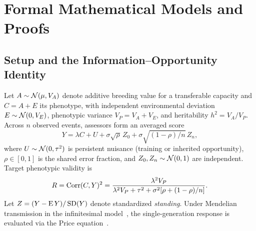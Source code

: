 
\appendices
\setcounter{equation}{0}
\renewcommand{\theequation}{A\arabic{equation}}
\renewcommand{\theHequation}{AppA.eq.\arabic{equation}}

\section{Formal Mathematical Models and Proofs}\label{app:theory}\label{sec:theory}

\subsection{Setup and the Information--Opportunity Identity}
Let $A\sim\mathcal{N}(\mu,V_A)$ denote additive breeding value for a transferable capacity and $C=A+E$ its phenotype, with independent environmental deviation $E\sim\mathcal{N}(0,V_E)$, phenotypic variance $V_P=V_A+V_E$, and heritability $h^2=V_A/V_P$. Across $n$ observed events, assessors form an averaged score
\begin{equation}
Y=\lambda C+U+\sigma\sqrt{\rho}\,Z_0+\sigma\sqrt{(1-\rho)/n}\,Z_n,\label{eq:score}
\end{equation}
where $U\sim\mathcal{N}(0,\tau^2)$ is persistent nuisance (training or inherited opportunity), $\rho\in[0,1]$ is the shared error fraction, and $Z_0,Z_n\sim\mathcal{N}(0,1)$ are independent. Target phenotypic validity is
\begin{equation}
R=\operatorname{Corr}(C,Y)^2=\frac{\lambda^2V_P}{\lambda^2V_P+\tau^2+\sigma^2[\rho+(1-\rho)/n]}.\label{eq:validity}
\end{equation}
Let $Z=(Y-\operatorname{E} Y)/\operatorname{SD}(Y)$ denote standardized \emph{standing}. Under Mendelian transmission in the infinitesimal model~\cite{bulmer1980}, the single-generation response is evaluated via the Price equation~\cite{price1970}.

